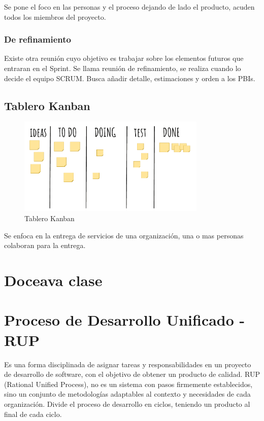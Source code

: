\documentclass[titlepage,a4paper]{article}
\begin{document}
Se pone el foco en las personas y el proceso dejando de lado el producto, acuden todos los miembros del proyecto.
 
\subsubsection*{De refinamiento}
Existe otra reunión cuyo objetivo es trabajar sobre los elementos futuros que entraran en el Sprint. Se llama reunión de refinamiento, se realiza cuando lo decide el equipo SCRUM. Busca añadir detalle, estimaciones y orden a los PBIs.



\subsection{Tablero Kanban}

\begin{figure}[!htb]
    \centering
    \includegraphics[width=0.8\textwidth]{Imagenes/Kanbanboard.png}
    \caption{Tablero Kanban}
\end{figure}

Se enfoca en la entrega de servicios de una organización, una o mas personas colaboran para la entrega.

\section*{Doceava clase}
\section{Proceso de Desarrollo Unificado - RUP}

Es una forma disciplinada de asignar tareas y responsabilidades en un proyecto de desarrollo de software, con el objetivo de obtener un producto de calidad. RUP (Rational Unified Process), no es un sistema con pasos firmemente establecidos, sino un conjunto de metodologías adaptables al contexto y necesidades de cada organización. Divide el proceso de desarrollo en ciclos, teniendo un producto al final de cada ciclo.
\end{document}
